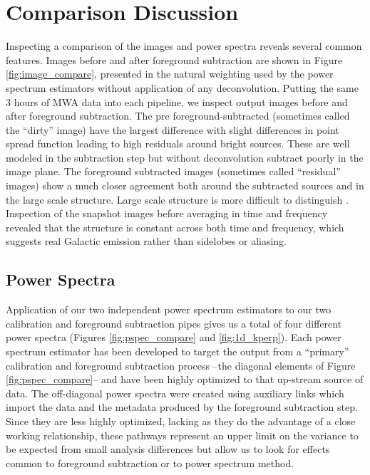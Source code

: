 \documentclass[twolcolumn,iop]{emulateapj}
\begin{document}
\section{Comparison Discussion}
\label{sec:results}
Inspecting a comparison of the images and power spectra reveals several common features. Images before and after foreground subtraction are shown in Figure \ref{fig:image_compare}, presented in the natural weighting used by the power spectrum estimators without application of any deconvolution.  Putting the same 3 hours of MWA data into each pipeline, we inspect output images before and after foreground subtraction. The pre foreground-subtracted (sometimes called the ``dirty'' image) have the largest difference with slight differences in point spread function leading to high residuals around bright sources. These are well modeled in the subtraction step but without deconvolution subtract poorly in the image plane.  The foreground subtracted images (sometimes called ``residual'' images) show a much closer agreement both around the subtracted sources and in the large scale structure. Large scale structure is more difficult to distinguish . Inspection of the snapshot images before averaging in time and frequency revealed that the structure is constant across both time and frequency, which suggests real Galactic emission rather than sidelobes or aliasing.  



\subsection{Power Spectra}
\label{sec:power_spectrum_comparison}
Application of our two independent power spectrum estimators to our two calibration and foreground subtraction pipes gives us a total of four different power spectra (Figures \ref{fig:pspec_compare} and \ref{fig:1d_kperp}).  Each power spectrum estimator has been developed to target the output from a ``primary'' calibration and foreground subtraction process --the diagonal elements of Figure \ref{fig:pspec_compare}-- and have been highly optimized to that up-stream source of data.  The off-diagonal power spectra were created using auxiliary links which import the data and the metadata produced by the foreground subtraction step.  Since they are less highly optimized, lacking as they do the advantage of a close working relationship, these pathways represent an upper limit on the variance to be expected from small analysis differences but allow us to look for effects common to foreground subtraction or to power spectrum method.
\end{document}
